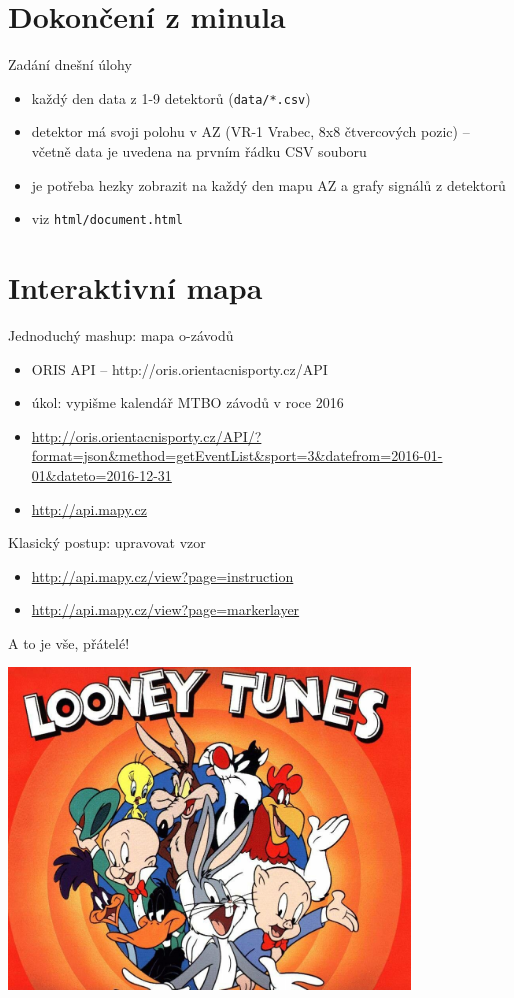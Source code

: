 \documentclass{beamer}
\begin{document}
\section{Dokončení z minula}

\begin{frame}{Zadání dnešní úlohy}
  \begin{itemize}
    \item každý den data z 1-9 detektorů (\texttt{data/*.csv})
    \item detektor má svoji polohu v AZ (VR-1 Vrabec, 8x8 čtvercových pozic) -- včetně data je uvedena na prvním řádku CSV souboru
    \item je potřeba hezky zobrazit na každý den mapu AZ a grafy signálů z detektorů
    \item viz \texttt{html/document.html}
  \end{itemize}
\end{frame}

\section{Interaktivní mapa}

\begin{frame}{Jednoduchý mashup: mapa o-závodů}
  \begin{itemize}
    \item ORIS API -- http://oris.orientacnisporty.cz/API
    \item úkol: vypišme kalendář MTBO závodů v roce 2016
    \item {\tiny \url{http://oris.orientacnisporty.cz/API/?format=json\&method=getEventList\&sport=3\&datefrom=2016-01-01\&dateto=2016-12-31}}
    \item {\tiny \url{http://api.mapy.cz}}
  \end{itemize}
\end{frame}

\begin{frame}{Klasický postup: upravovat vzor}
  \begin{itemize}
    \item {\tiny \url{http://api.mapy.cz/view?page=instruction}}
    \item {\tiny \url{http://api.mapy.cz/view?page=markerlayer}}
  \end{itemize}
\end{frame}

\begin{frame}{A to je vše, přátelé!}
  \begin{center}
    \includegraphics[width=0.8\textwidth]{looney_tunes}
  \end{center}
\end{frame}
\end{document}
